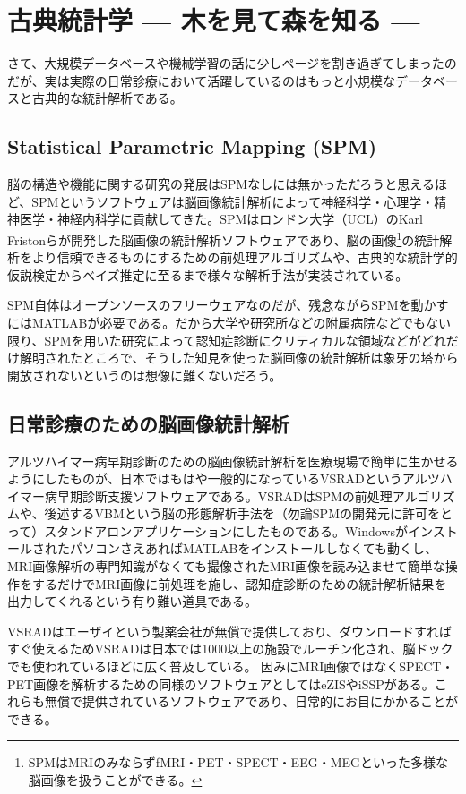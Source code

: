 \section{古典統計学 --- 木を見て森を知る ---}
さて、大規模データベースや機械学習の話に少しページを割き過ぎてしまったのだが、実は実際の日常診療において活躍しているのはもっと小規模なデータベースと古典的な統計解析である。

\subsection{Statistical Parametric Mapping (SPM)}
脳の構造や機能に関する研究の発展はSPMなしには無かっただろうと思えるほど、SPMというソフトウェアは脳画像統計解析によって神経科学・心理学・精神医学・神経内科学に貢献してきた。SPMはロンドン大学（UCL）のKarl Fristonらが開発した脳画像の統計解析ソフトウェアであり、脳の画像\footnote{SPMはMRIのみならずfMRI・PET・SPECT・EEG・MEGといった多様な脳画像を扱うことができる。}の統計解析をより信頼できるものにするための前処理アルゴリズムや、古典的な統計学的仮説検定からベイズ推定に至るまで様々な解析手法が実装されている。

SPM自体はオープンソースのフリーウェアなのだが、残念ながらSPMを動かすにはMATLABが必要である。だから大学や研究所などの附属病院などでもない限り、SPMを用いた研究によって認知症診断にクリティカルな領域などがどれだけ解明されたところで、そうした知見を使った脳画像の統計解析は象牙の塔から開放されないというのは想像に難くないだろう。
\subsection{日常診療のための脳画像統計解析}
アルツハイマー病早期診断のための脳画像統計解析を医療現場で簡単に生かせるようにしたものが、日本ではもはや一般的になっているVSRADというアルツハイマー病早期診断支援ソフトウェアである。VSRADはSPMの前処理アルゴリズムや、後述するVBMという脳の形態解析手法を（勿論SPMの開発元に許可をとって）スタンドアロンアプリケーションにしたものである。WindowsがインストールされたパソコンさえあればMATLABをインストールしなくても動くし、MRI画像解析の専門知識がなくても撮像されたMRI画像を読み込ませて簡単な操作をするだけでMRI画像に前処理を施し、認知症診断のための統計解析結果を出力してくれるという有り難い道具である。

VSRADはエーザイという製薬会社が無償で提供しており、ダウンロードすればすぐ使えるためVSRADは日本では1000以上の施設でルーチン化され、脳ドックでも使われているほどに広く普及している。
因みにMRI画像ではなくSPECT・PET画像を解析するための同様のソフトウェアとしてはeZISやiSSPがある。これらも無償で提供されているソフトウェアであり、日常的にお目にかかることができる。

